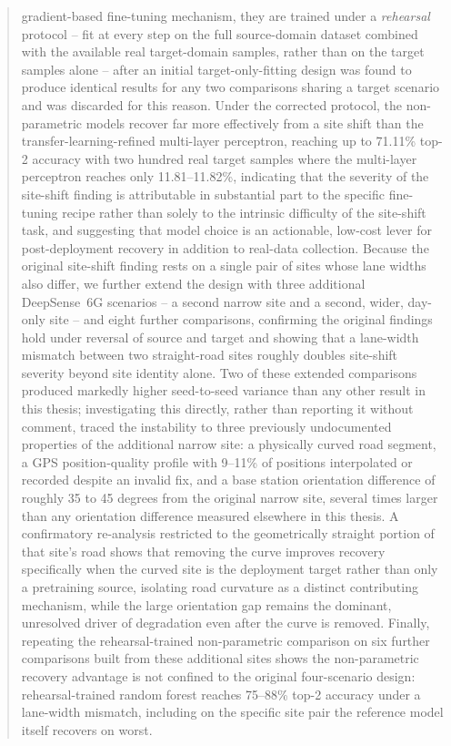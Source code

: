 \documentclass{iutbscthesis}
\begin{document}
\begin{abstract}
gradient-based fine-tuning mechanism, they are trained under a \emph{rehearsal} protocol -- fit at every step on the full source-domain dataset combined with the available real target-domain samples, rather than on the target samples alone -- after an initial target-only-fitting design was found to produce identical results for any two comparisons sharing a target scenario and was discarded for this reason. Under the corrected protocol, the non-parametric models recover far more effectively from a site shift than the transfer-learning-refined multi-layer perceptron, reaching up to 71.11\% top-2 accuracy with two hundred real target samples where the multi-layer perceptron reaches only 11.81--11.82\%, indicating that the severity of the site-shift finding is attributable in substantial part to the specific fine-tuning recipe rather than solely to the intrinsic difficulty of the site-shift task, and suggesting that model choice is an actionable, low-cost lever for post-deployment recovery in addition to real-data collection. Because the original site-shift finding rests on a single pair of sites whose lane widths also differ, we further extend the design with three additional DeepSense~6G scenarios -- a second narrow site and a second, wider, day-only site -- and eight further comparisons, confirming the original findings hold under reversal of source and target and showing that a lane-width mismatch between two straight-road sites roughly doubles site-shift severity beyond site identity alone. Two of these extended comparisons produced markedly higher seed-to-seed variance than any other result in this thesis; investigating this directly, rather than reporting it without comment, traced the instability to three previously undocumented properties of the additional narrow site: a physically curved road segment, a GPS position-quality profile with 9--11\% of positions interpolated or recorded despite an invalid fix, and a base station orientation difference of roughly 35 to 45 degrees from the original narrow site, several times larger than any orientation difference measured elsewhere in this thesis. A confirmatory re-analysis restricted to the geometrically straight portion of that site's road shows that removing the curve improves recovery specifically when the curved site is the deployment target rather than only a pretraining source, isolating road curvature as a distinct contributing mechanism, while the large orientation gap remains the dominant, unresolved driver of degradation even after the curve is removed. Finally, repeating the rehearsal-trained non-parametric comparison on six further comparisons built from these additional sites shows the non-parametric recovery advantage is not confined to the original four-scenario design: rehearsal-trained random forest reaches 75--88\% top-2 accuracy under a lane-width mismatch, including on the specific site pair the reference model itself recovers on worst.
\end{abstract}
\end{document}

